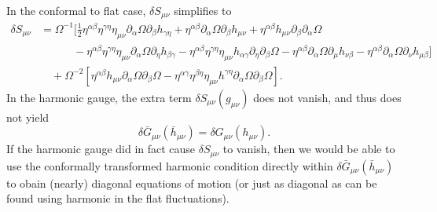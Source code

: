 \documentclass[10pt,letterpaper]{article}
\newcommand{\be}{\begin{equation}} %
\newcommand{\ee}{\end{equation}} %
\newcommand{\pd}{\partial}
\numberwithin{equation}{section}
\begin{document}
In the conformal to flat case, $\delta S_{\mu\nu}$ simplifies to
\begin{align}
	\delta S_{\mu\nu} &= \Omega^{-1}[\frac12 \eta^{\alpha\beta}\eta^{\gamma\eta}\eta_{\mu\nu}\pd_\alpha\Omega \pd_\beta h_{\gamma\eta}+\eta^{\alpha\beta}
\pd_\alpha \Omega \pd_\beta h_{\mu\nu} + \eta^{\alpha\beta}h_{\mu\nu}\pd_\beta\pd_\alpha\Omega\\
&\qquad\quad 
-\eta^{\alpha\beta}\eta^{\gamma\eta}\eta_{\mu\nu}\pd_\alpha\Omega \pd_\eta h_{\beta\gamma} - \eta^{\alpha\beta}\eta^{\gamma\eta}\eta_{\mu\nu}h_{\alpha\gamma}\pd_\eta \pd_\beta \Omega - \eta^{\alpha\beta}\pd_\alpha\Omega \pd_\mu h_{\nu\beta} - \eta^{\alpha\beta}\pd_\alpha \Omega \pd_\nu h_{\mu\beta}]\nonumber \\
&\quad + \Omega^{-2}[ \eta^{\alpha\beta}h_{\mu\nu} \pd_\alpha\Omega \pd_\beta\Omega - \eta^{\alpha\gamma}\eta^{\beta\eta}\eta_{\mu\nu} h^{\gamma\eta}\pd_\alpha\Omega \pd_\beta\Omega]. \nonumber
\end{align}
In the harmonic gauge, the extra term $\delta S_{\mu\nu}(g_{\mu\nu})$ does not vanish, and thus does not yield
\be
	\delta \bar G_{\mu\nu}(\bar h_{\mu\nu}) = \delta G_{\mu\nu}(h_{\mu\nu}).
\ee
If the harmonic gauge did in fact cause $\delta S_{\mu\nu}$ to vanish, then we would be able to use the conformally transformed harmonic condition directly within $\delta \bar G_{\mu\nu}(\bar h_{\mu\nu})$ to obain (nearly) diagonal equations of motion (or just as diagonal as can be found using harmonic in the flat fluctuations).
%
%
\end{document}
